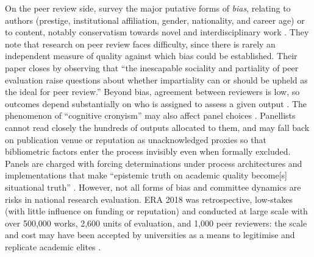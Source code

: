 On the peer review side, \cite{leeBiasPeerReview2013} survey the major putative forms of \textit{bias}, relating to authors (prestige, institutional affiliation, gender, nationality, and career age) or to content, notably conservatism towards novel and interdisciplinary work \citep[see also][]{boudreauLookingLookingKnowledge2016, bromhamInterdisciplinaryResearchHas2016}. They note that research on peer review faces difficulty, since there is rarely an independent measure of quality against which bias could be established. Their paper closes by observing that \enquote{the inescapable sociality and partiality of peer evaluation raise questions about whether impartiality can or should be upheld as the ideal for peer review.} Beyond bias, agreement between reviewers is low, so outcomes depend substantially on who is assigned to assess a given output \citep{bornmannScientificPeerReview2011, pierLowAgreementReviewers2018}. The phenomenon of \enquote{cognitive cronyism} may also affect panel choices \citep{travisNewLightOld1991}. Panellists cannot read closely the hundreds of outputs allocated to them, and may fall back on publication venue or reputation as unacknowledged proxies \citep{wilsdonMetricTide2015} so that bibliometric factors enter the process invisibly even when formally excluded. Panels are charged with forcing determinations under process architectures and implementations that make \enquote{epistemic truth on academic quality become[s] situational truth} \citep[][p. 143]{milyaevaLetsAgreeAgree2023}. However, not all forms of bias and committee dynamics are risks in national research evaluation. ERA 2018 was retrospective, low-stakes (with little influence on funding or reputation) and conducted at large scale with over 500,000 works, 2,600 units of evaluation, and 1,000 peer reviewers: the scale and cost may have been accepted by universities as a means to legitimise and replicate academic elites \citep{sayerRankHypocrisiesInsult2014}.

